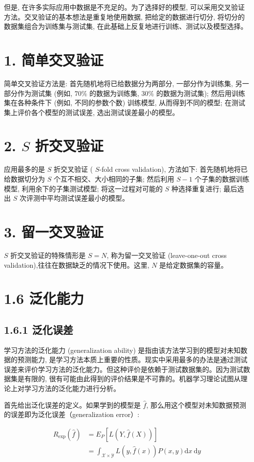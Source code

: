 \documentclass[10pt]{article}
\begin{document}
但是, 在许多实际应用中数据是不充足的。为了选择好的模型, 可以采用交叉验证方法。交叉验证的基本想法是重复地使用数据, 把给定的数据进行切分, 将切分的数据集组合为训练集与测试集, 在此基础上反复地进行训练、测试以及模型选择。

\section*{1. 简单交叉验证}
简单交叉验证方法是: 首先随机地将已给数据分为两部分, 一部分作为训练集, 另一部分作为测试集 (例如, $70 \%$ 的数据为训练集, $30 \%$ 的数据为测试集); 然后用训练集在各种条件下 (例如, 不同的参数个数) 训练模型, 从而得到不同的模型; 在测试集上评价各个模型的测试误差, 选出测试误差最小的模型。

\section*{2. $S$ 折交叉验证}
应用最多的是 $S$ 折交叉验证 ( $S$-fold cross validation), 方法如下: 首先随机地将已给数据切分为 $S$ 个互不相交、大小相同的子集; 然后利用 $S-1$ 个子集的数据训练模型, 利用余下的子集测试模型; 将这一过程对可能的 $S$ 种选择重复进行; 最后选出 $S$ 次评测中平均测试误差最小的模型。

\section*{3. 留一交叉验证}
$S$ 折交叉验证的特殊情形是 $S=N$, 称为留一交叉验证 (leave-one-out cross validation),往往在数据缺乏的情况下使用。这里, $N$ 是给定数据集的容量。

\section*{1.6 泛化能力}
\subsection*{1.6.1 泛化误差}
学习方法的泛化能力 (generalization ability) 是指由该方法学习到的模型对未知数据的预测能力, 是学习方法本质上重要的性质。现实中采用最多的办法是通过测试误差来评价学习方法的泛化能力。但这种评价是依赖于测试数据集的。因为测试数据集是有限的, 很有可能由此得到的评价结果是不可靠的。机器学习理论试图从理论上对学习方法的泛化能力进行分析。

首先给出泛化误差的定义。如果学到的模型是 $\hat{f}$, 那么用这个模型对未知数据预测的误差即为泛化误差（generalization error）:


\begin{align*}
R_{\exp }(\hat{f}) & =E_{P}[L(Y, \hat{f}(X))] \\
& =\int_{\mathcal{X} \times \mathcal{Y}} L(y, \hat{f}(x)) P(x, y) \mathrm{d} x \mathrm{~d} y \tag{1.27}
\end{align*}
\end{document}
